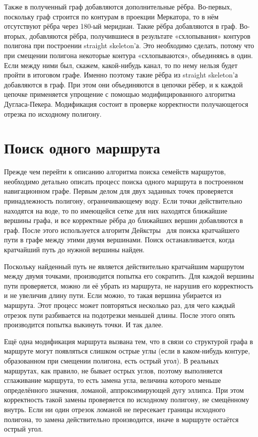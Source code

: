 Также в полученный граф добавляются дополнительные рёбра. Во-первых,
поскольку граф строится по контурам в проекции Меркатора, то в нём
отсутствуют рёбра через 180-ый меридиан. Такие рёбра добавляются в
граф. Во-вторых, добавляются рёбра, получившиеся в результате
«схлопывания» контуров полигона при построении straight skeleton'а.
Это необходимо сделать, потому что при смещении полигона некоторые
контура «схлопываются», объединяясь в один. Если между ними был,
скажем, какой-нибудь канал, то по нему нельзя будет пройти в итоговом
графе. Именно поэтому такие рёбра из straight skeleton'а добавляются в
граф. При этом они объединяются в цепочки рёбер, и к каждой цепочке
применяется упрощение с помощью модифицированного алгоритма
Дугласа-Пекера. Модификация состоит в проверке корректности
получающегося отрезка по исходному полигону.

\FloatBarrier

\section{Поиск одного маршрута}

\label{sec:single-search}

Прежде чем перейти к описанию алгоритма поиска семейств маршрутов,
необходимо детально описать процесс поиска одного маршрута в
построенном навигационном графе. Первым делом для двух заданных точек
проверяется принадлежность полигону, ограничивающему воду. Если точки
действительно находятся на воде, то по имеющейся сетке для них
находятся ближайшие вершины графа, и все корректные рёбра до ближайших
вершин добавляются в граф. После этого используется алгоритм
Дейкстры~\cite{dijkstra1959note} для поиска кратчайшего пути в графе между
этими двумя вершинами. Поиск останавливается, когда кратчайший путь до
нужной вершины найден.

Поскольку найденный путь не является действительно кратчайшим
маршрутом между двумя точками, производится попытка его сократить. Для
каждой вершины пути проверяется, можно ли её убрать из маршрута, не
нарушив его корректность и не увеличив длину пути. Если можно, то
такая вершина убирается из маршрута. Этот процесс может повторяться
несколько раз, для чего каждый отрезок пути разбивается на подотрезки
меньшей длины. После этого опять производится попытка выкинуть точки.
И так далее.

Ещё одна модификация маршрута вызвана тем, что в связи со структурой
графа в маршруте могут появляться слишком острые углы (если в
каком-нибудь контуре, образованном при смещении полигона, есть острый
угол). В реальных маршрутах, как правило, не бывает острых углов,
поэтому выполняется сглаживание маршрута, то есть замена угла,
величина которого меньше определённого значения, ломаной,
аппроксимирующей дугу эллипса. При этом корректность такой замены
проверяется по исходному полигону, не смещённому внутрь. Если ни один
отрезок ломаной не пересекает границы исходного полигона, то замена
действительно производится, иначе в маршруте остаётся острый угол.

